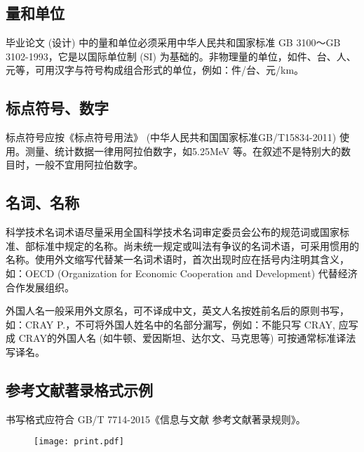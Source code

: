\subsection{量和单位}
毕业论文 (设计) 中的量和单位必须采用中华人民共和国家标准 GB 3100～GB 3102-1993，它是以国际单位制 (SI) 为基础的。非物理量的单位，如件、台、人、元等，可用汉字与符号构成组合形式的单位，例如：件/台、元/km。
\subsection{标点符号、数字}
标点符号应按《标点符号用法》 (中华人民共和国国家标准GB/T15834-2011) 使用。测量、统计数据一律用阿拉伯数字，如5.25MeV 等。在叙述不是特别大的数目时，一般不宜用阿拉伯数字。
\subsection{名词、名称}
科学技术名词术语尽量采用全国科学技术名词审定委员会公布的规范词或国家标准、部标准中规定的名称。尚未统一规定或叫法有争议的名词术语，可采用惯用的名称。使用外文缩写代替某一名词术语时，首次出现时应在括号内注明其含义，如：OECD (Organization for Economic Cooperation and Development) 代替经济合作发展组织。

外国人名一般采用外文原名，可不译成中文，英文人名按姓前名后的原则书写，如：CRAY P.，不可将外国人姓名中的名部分漏写，例如：不能只写 CRAY, 应写成 CRAY的外国人名 (如牛顿、爱因斯坦、达尔文、马克思等) 可按通常标准译法写译名。
\subsection{参考文献著录格式示例}
书写格式应符合 GB/T 7714-2015《信息与文献 参考文献著录规则》。

\vspace{2cm}

\begin{figure}[htbp]
\centering
\texttt{[image: print.pdf]}
\end{figure}